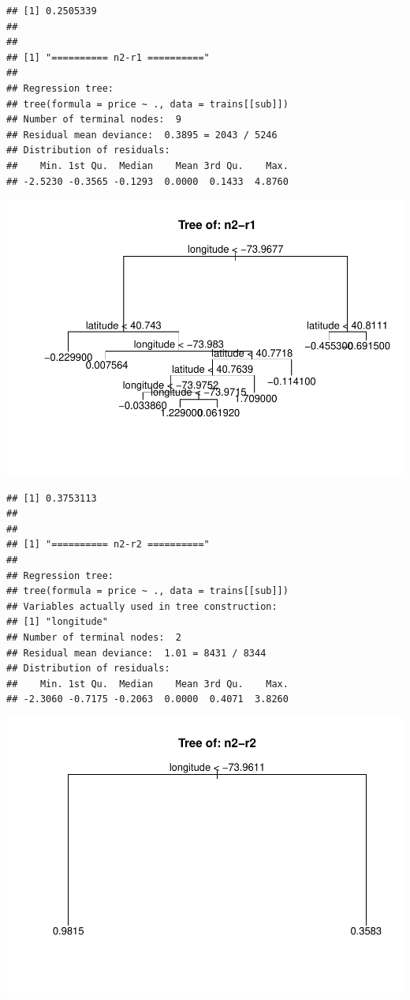 \documentclass[
]{article}
\begin{document}
\begin{verbatim}
## [1] 0.2505339
## 
## 
## [1] "========== n2-r1 =========="
## 
## Regression tree:
## tree(formula = price ~ ., data = trains[[sub]])
## Number of terminal nodes:  9 
## Residual mean deviance:  0.3895 = 2043 / 5246 
## Distribution of residuals:
##    Min. 1st Qu.  Median    Mean 3rd Qu.    Max. 
## -2.5230 -0.3565 -0.1293  0.0000  0.1433  4.8760
\end{verbatim}

\includegraphics{project-code_files/figure-latex/unnamed-chunk-14-9.pdf}

\begin{verbatim}
## [1] 0.3753113
## 
## 
## [1] "========== n2-r2 =========="
## 
## Regression tree:
## tree(formula = price ~ ., data = trains[[sub]])
## Variables actually used in tree construction:
## [1] "longitude"
## Number of terminal nodes:  2 
## Residual mean deviance:  1.01 = 8431 / 8344 
## Distribution of residuals:
##    Min. 1st Qu.  Median    Mean 3rd Qu.    Max. 
## -2.3060 -0.7175 -0.2063  0.0000  0.4071  3.8260
\end{verbatim}

\includegraphics{project-code_files/figure-latex/unnamed-chunk-14-10.pdf}
\end{document}
